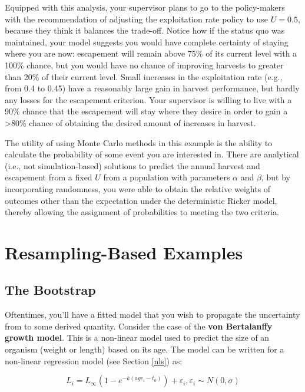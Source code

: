 \documentclass[]{book}
\theoremstyle{definition}
\theoremstyle{definition}
\theoremstyle{definition}
\theoremstyle{remark}
\begin{document}
Equipped with this analysis, your supervisor plans to go to the
policy-makers with the recommendation of adjusting the exploitation rate
policy to use \(U = 0.5\), because they think it balances the trade-off.
Notice how if the status quo was maintained, your model suggests you
would have complete certainty of staying where you are now: escapement
will remain above 75\% of its current level with a 100\% chance, but you
would have no chance of improving harvests to greater than 20\% of their
current level. Small increases in the exploitation rate (e.g., from 0.4
to 0.45) have a reasonably large gain in harvest performance, but hardly
any losses for the escapement criterion. Your supervisor is willing to
live with a 90\% chance that the escapement will stay where they desire
in order to gain a \textgreater{}80\% chance of obtaining the desired
amount of increases in harvest.

The utility of using Monte Carlo methods in this example is the ability
to calculate the probability of some event you are interested in. There
are analytical (i.e., not simulation-based) solutions to predict the
annual harvest and escapement from a fixed \(U\) from a population with
parameters \(\alpha\) and \(\beta\), but by incorporating randomness,
you were able to obtain the relative weights of outcomes other than the
expectation under the deterministic Ricker model, thereby allowing the
assignment of probabilities to meeting the two criteria.

\section{Resampling-Based Examples}\label{resample-examples}

\subsection{The Bootstrap}\label{boot-test-ex}

Oftentimes, you'll have a fitted model that you wish to propagate the
uncertainty from to some derived quantity. Consider the case of the
\textbf{von Bertalanffy growth model}. This is a non-linear model used
to predict the size of an organism (weight or length) based on its age.
The model can be written for a non-linear regression model (see Section
\ref{nls}) as:

\begin{equation}
  L_i = L_{\infty}\left(1 - e^{-k(age_i-t_0)}\right) + \varepsilon_i, \varepsilon_i \sim N(0, \sigma)
\label{eq:vonB}
\end{equation}
\end{document}
